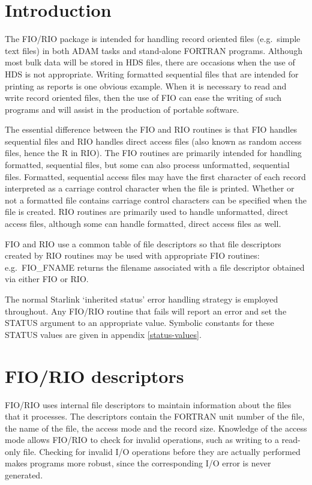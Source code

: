 \documentclass[twoside,11pt,nolof]{starlink}
\begin{document}
\scfrontmatter

\section{Introduction}

The FIO/RIO package is intended for handling record oriented files
(e.g.\ simple text files) in both ADAM tasks and stand-alone FORTRAN programs.
Although most bulk data will be stored in HDS files, there are occasions when
the use of HDS is not appropriate. Writing formatted sequential files that are
intended for printing as reports is one obvious example. When it is necessary
to read and write record oriented files, then the use of FIO can ease the
writing of such programs and will assist in the production of portable
software.

The essential difference between the FIO and RIO routines is that FIO handles
sequential files and RIO handles direct access files (also known as random
access files, hence the R in RIO). The FIO routines are primarily intended for
handling formatted, sequential files, but some can also process unformatted,
sequential files. Formatted, sequential access files may have the first
character of each record interpreted as a carriage control character when the
file is printed. Whether or not a formatted file contains carriage control
characters can be specified when the file is created. RIO routines are
primarily used to handle unformatted, direct access files, although some can
handle formatted, direct access files as well.

FIO and RIO use a common table of file descriptors so that file descriptors
created by RIO routines may be used with appropriate FIO routines:
e.g.\ FIO\_FNAME returns the filename associated with a file descriptor
obtained via either FIO or RIO.

The normal Starlink `inherited status' error handling strategy is employed
throughout. Any FIO/RIO routine that fails will report an error and set the
STATUS argument to an appropriate value. Symbolic constants for these STATUS
values are given in appendix \ref{status-values}.

\section{FIO/RIO descriptors}

FIO/RIO uses internal file descriptors to maintain information about the files
that it processes. The descriptors contain the FORTRAN unit number of the file,
the name of the file, the access mode and the record size. Knowledge of the
access mode allows FIO/RIO to check for invalid operations, such as writing to
a read-only file. Checking for invalid I/O operations before they are actually
performed makes programs more robust, since the corresponding I/O error is
never generated.
\end{document}

